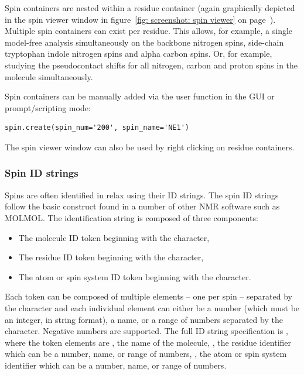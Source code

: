 Spin containers are nested within a residue container (again graphically depicted in the spin viewer window in figure~\ref{fig: screenshot: spin viewer} on page~\pageref{fig: screenshot: spin viewer}).
Multiple spin containers can exist per residue.
This allows, for example, a single model-free analysis simultaneously on the backbone nitrogen spins, side-chain tryptophan indole nitrogen spins and alpha carbon spins.
Or, for example, studying the pseudocontact shifts for all nitrogen, carbon and proton spins in the molecule simultaneously.

Spin containers can be manually added via the  user function in the GUI or prompt/scripting mode:

\begin{lstlisting}
spin.create(spin_num='200', spin_name='NE1')
\end{lstlisting}

The spin viewer window can also be used by right clicking on residue containers.



\subsubsection{Spin ID strings} \label{sect: spin ID}

Spins are often identified in relax using their ID strings.
The spin ID strings follow the basic construct found in a number of other NMR software such as MOLMOL.
The identification string is composed of three components:
\begin{itemize}
  \item The molecule ID token beginning with the \promptstring{\#} character,
  \item The residue ID token beginning with the \promptstring{:} character,
  \item The atom or spin system ID token beginning with the  character.
\end{itemize}

Each token can be composed of multiple elements -- one per spin -- separated by the \promptstring{,} character and each individual element can either be a number (which must be an integer, in string format), a name, or a range of numbers separated by the \promptstring{-} character.
Negative numbers are supported.
The full ID string specification is , where the token elements are , the name of the molecule, , the residue identifier which can be a number, name, or range of numbers, , the atom or spin system identifier which can be a number, name, or range of numbers.

